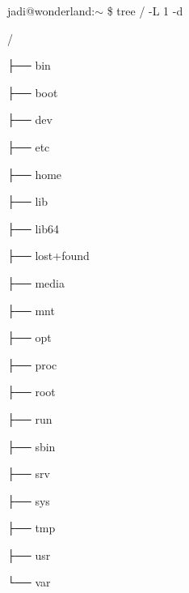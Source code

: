 \begin{latin}
\begin{mybox}
jadi@wonderland:$\sim$ \$ tree / -L 1 -d

/

├── bin

\vspace{-0.15cm}

├── boot

\vspace{-0.15cm}

├── dev

\vspace{-0.15cm}

├── etc

\vspace{-0.15cm}

├── home

\vspace{-0.15cm}

├── lib

\vspace{-0.15cm}

├── lib64

\vspace{-0.15cm}

├── lost+found

\vspace{-0.15cm}

├── media

\vspace{-0.15cm}

├── mnt

\vspace{-0.15cm}

├── opt

\vspace{-0.15cm}

├── proc

\vspace{-0.15cm}

├── root

\vspace{-0.15cm}

├── run

\vspace{-0.15cm}

├── sbin

\vspace{-0.15cm}

├── srv

\vspace{-0.15cm}

├── sys

\vspace{-0.15cm}

├── tmp

\vspace{-0.15cm}

├── usr

\vspace{-0.15cm}

└── var
\end{mybox}
\end{latin}
